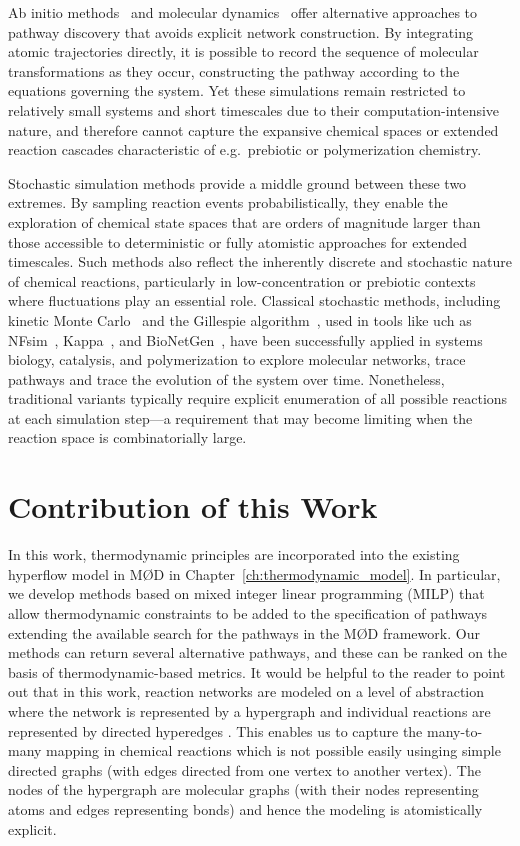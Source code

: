 Ab initio methods~\cite{abinitio1,abinitio2,abinitio3} and molecular dynamics~\cite{md1,md2,md3} offer alternative approaches to pathway discovery that avoids explicit network construction. By integrating atomic trajectories directly, it is possible to record the sequence of molecular transformations as they occur, constructing the pathway according to the equations governing the system.
Yet these simulations remain restricted to relatively small systems and short timescales due to their computation-intensive nature, and therefore cannot capture the expansive chemical spaces or extended reaction cascades characteristic of e.g.\ prebiotic or polymerization chemistry.~\cite{highSimCost1,highSimCost2}

Stochastic simulation methods provide a middle ground between these two extremes. 
By sampling reaction events probabilistically, they enable the exploration of chemical state spaces that are orders of magnitude larger than those accessible to deterministic or fully atomistic approaches for extended timescales. 
Such methods also reflect the inherently discrete and stochastic nature of chemical reactions, particularly in low-concentration or prebiotic contexts where fluctuations play an essential role. 
Classical stochastic methods, including kinetic Monte Carlo~\cite{kmc} and the Gillespie algorithm~\cite{gillespie,gillespie2,gillespie3}, used in tools like uch as NFsim~\cite{nfsim}, Kappa~\cite{kappa}, and BioNetGen~\cite{bngl,bngl2},  
have been successfully applied in systems biology, catalysis, and polymerization to explore molecular networks, trace pathways and trace the evolution of the system over time.
Nonetheless, traditional variants typically require explicit enumeration of all possible reactions at each simulation step—a requirement that may become limiting when the reaction space is combinatorially large.

\section{Contribution of this Work}

In this work, thermodynamic principles are incorporated into the existing hyperflow model in M{\O}D in Chapter~\ref{ch:thermodynamic_model}.
In particular, we develop methods based on mixed integer linear programming (MILP) that allow thermodynamic constraints to be added to the specification of pathways extending the available search for the pathways in the M{\O}D framework.
Our methods can return several alternative pathways, and these can be ranked on the basis of thermodynamic-based metrics. 
It would be helpful to the reader to point out that in this work, reaction networks are modeled on a level of abstraction where the network is represented by a hypergraph and individual reactions are represented by directed hyperedges \cite{jakob_integer_hyperflows}.
This enables us to capture the many-to-many mapping in chemical reactions which is not possible easily usinging simple directed graphs (with edges directed from one vertex to another vertex).
The nodes of the hypergraph are molecular graphs (with their nodes representing atoms and edges representing bonds) and hence the modeling is atomistically explicit.

